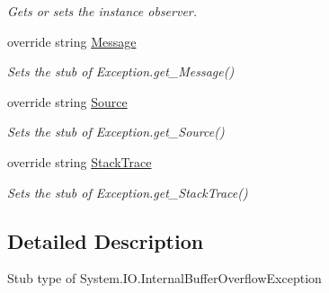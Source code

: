 \begin{DoxyCompactItemize}
\begin{DoxyCompactList}\small\item\em Gets or sets the instance observer.\end{DoxyCompactList}\item 
override string \hyperlink{class_system_1_1_i_o_1_1_fakes_1_1_stub_internal_buffer_overflow_exception_aef1cf0005c6135834374edc9fe12dccb}{Message}
\begin{DoxyCompactList}\small\item\em Sets the stub of Exception.\-get\-\_\-\-Message()\end{DoxyCompactList}\item 
override string \hyperlink{class_system_1_1_i_o_1_1_fakes_1_1_stub_internal_buffer_overflow_exception_a54da5a953ac8c5907742b0d2957a3d45}{Source}
\begin{DoxyCompactList}\small\item\em Sets the stub of Exception.\-get\-\_\-\-Source()\end{DoxyCompactList}\item 
override string \hyperlink{class_system_1_1_i_o_1_1_fakes_1_1_stub_internal_buffer_overflow_exception_a0a36bdaeed8c564059604ab213de55eb}{Stack\-Trace}
\begin{DoxyCompactList}\small\item\em Sets the stub of Exception.\-get\-\_\-\-Stack\-Trace()\end{DoxyCompactList}\end{DoxyCompactItemize}


\subsection{Detailed Description}
Stub type of System.\-I\-O.\-Internal\-Buffer\-Overflow\-Exception



